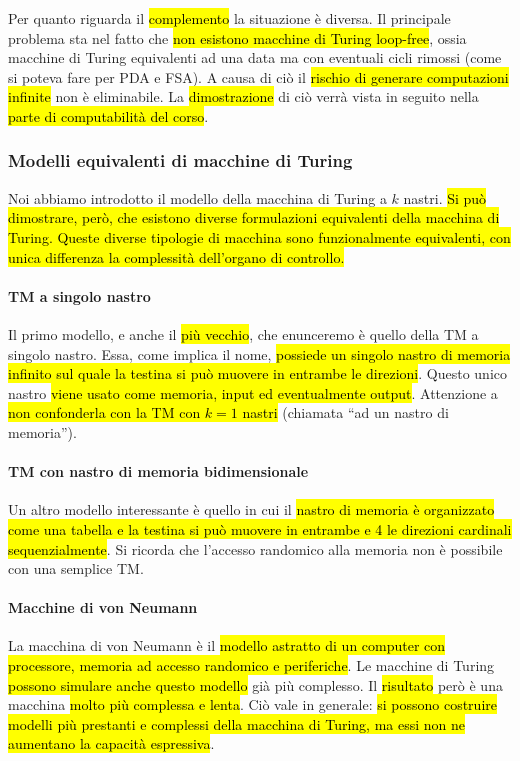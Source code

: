 \documentclass[a4paper,11pt,oneside]{article}
\theoremstyle{plain}
\theoremstyle{definition}
\theoremstyle{remark}
\begin{document}
Per quanto riguarda il \hl{complemento} la situazione è diversa. Il principale
problema sta nel fatto che \hl{non esistono macchine di Turing loop-free}, ossia
macchine di Turing equivalenti ad una data ma con eventuali cicli rimossi (come
si poteva fare per PDA e FSA). A causa di ciò il \hl{rischio di generare
computazioni infinite} non è eliminabile. La \hl{dimostrazione} di ciò verrà
vista in seguito nella \hl{parte di computabilità del corso}.

\subsubsection{Modelli equivalenti di macchine di Turing}\label{sec:modelli-mt}

Noi abbiamo introdotto il modello della macchina di Turing a $k$ nastri. \hl{Si
può dimostrare, però, che esistono diverse formulazioni equivalenti della
macchina di Turing. Queste diverse tipologie di macchina sono funzionalmente
equivalenti, con unica differenza la complessità dell'organo di controllo.}

\paragraph{TM a singolo nastro} Il primo modello, e anche il \hl{più
vecchio}, che enunceremo è quello della TM a singolo nastro. Essa, come implica
il nome, \hl{possiede un singolo nastro di memoria infinito sul quale la testina
si può muovere in entrambe le direzioni}. Questo unico nastro \hl{viene usato
come memoria, input ed eventualmente output}. Attenzione a \hl{non confonderla
con la TM con $k=1$ nastri} (chiamata ``ad un nastro di memoria'').

\paragraph{TM con nastro di memoria bidimensionale} Un altro modello
interessante è quello in cui il \hl{nastro di memoria è organizzato come una
tabella e la testina si può muovere in entrambe e 4 le direzioni cardinali
sequenzialmente}. Si ricorda che l'accesso randomico alla memoria non è
possibile con una semplice TM\@.

\paragraph{Macchine di von Neumann} La macchina di von Neumann è il
\hl{modello astratto di un computer con processore, memoria ad accesso randomico
e periferiche}. Le macchine di Turing \hl{possono simulare anche questo modello}
già più complesso. Il \hl{risultato} però è una macchina \hl{molto più complessa
e lenta}. Ciò vale in generale: \hl{si possono costruire modelli più prestanti e
complessi della macchina di Turing, ma essi non ne aumentano la capacità
espressiva}.
\end{document}
